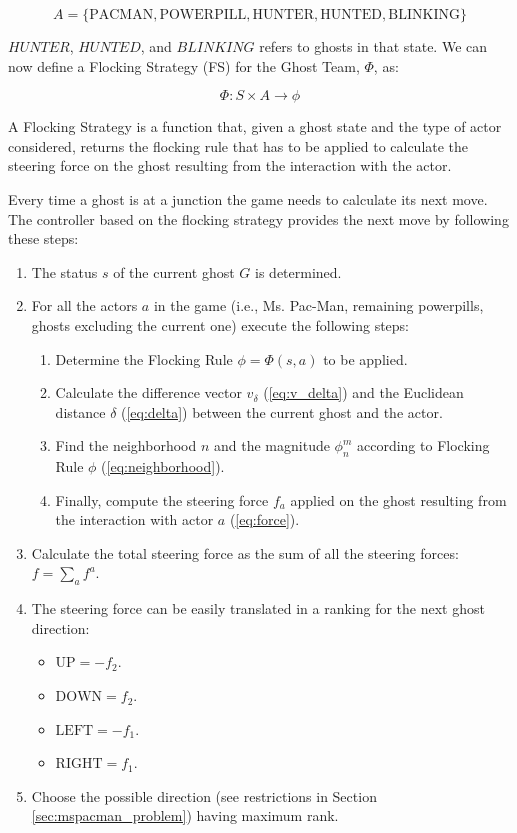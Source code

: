 \documentclass{llncs}
\begin{document}
$$A=\{\mathrm{PACMAN}, \mathrm{POWERPILL}, \mathrm{HUNTER}, \mathrm{HUNTED}, \mathrm{BLINKING}\}$$

$HUNTER$, $HUNTED$, and $BLINKING$ refers to ghosts in that state. We can now define a Flocking Strategy (FS) for the Ghost Team, $\Phi$, as:

$$\Phi : S \times A \to \phi$$

A Flocking Strategy is a function that, given a ghost state and the type of actor considered, returns the flocking rule that has to be applied to calculate the steering force on the ghost resulting from the interaction with the actor.

Every time a ghost is at a junction the game needs to calculate its next move. The controller based on the flocking strategy provides the next move by following these steps:

\begin{enumerate}
	\item The status $s$ of the current ghost $G$ is determined.
	\item For all the actors $a$ in the game (i.e., Ms. Pac-Man, remaining powerpills, ghosts excluding the current one) execute the following steps:
	\begin{enumerate}
		\item Determine the Flocking Rule $\phi = \Phi(s,a)$ to be applied.
		\item Calculate the difference vector $v_\delta$ (\ref{eq:v_delta}) and the Euclidean distance $\delta$ (\ref{eq:delta}) between the current ghost and the actor. 
		\item Find the neighborhood $n$ and the magnitude $\phi^m_n$ according to Flocking Rule $\phi$ (\ref{eq:neighborhood}).
		\item Finally, compute the steering force $f_a$ applied on the ghost resulting from the interaction with actor $a$ (\ref{eq:force}).
	\end{enumerate}
	\item Calculate the total steering force as the sum of all the steering forces: $f = \sum_a f^a$.
	\item The steering force can be easily translated in a ranking for the next ghost direction:
	\begin{itemize}
		\item $\mathrm{UP} = - f_2$.
		\item $\mathrm{DOWN} = f_2$.
		\item $\mathrm{LEFT} = - f_1$.
		\item $\mathrm{RIGHT} = f_1$.
	\end{itemize}
	\item Choose the possible direction (see restrictions in Section \ref{sec:mspacman_problem}) having maximum rank.
\end{enumerate}
\end{document}
